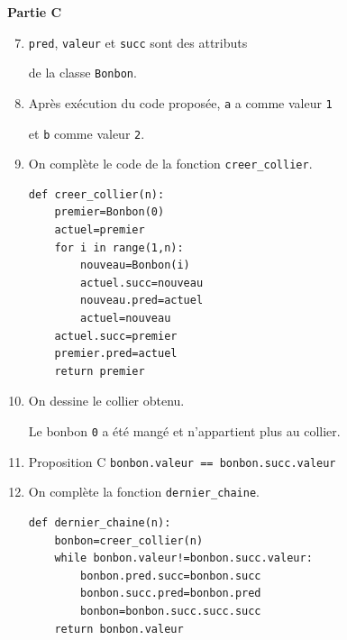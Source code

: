 \documentclass[11pt,a4paper]{article}
\newcommand{\mip}[1]{\texttt{#1}}
\begin{document}
\vspace{-2cm}


\textbf{Partie C}

\begin{enumerate}
\setcounter{enumi}{6}
\item \mip{pred}, \mip{valeur} et \mip{succ} sont des attributs 

de la classe \mip{Bonbon}.
\item Après exécution du code proposée, \mip{a} a comme valeur \mip{1}

et \mip{b} comme valeur \mip{2}.

\item On complète le code de la fonction \mip{creer_collier}.

\begin{verbatim}
def creer_collier(n):
    premier=Bonbon(0)
    actuel=premier
    for i in range(1,n):
        nouveau=Bonbon(i)
        actuel.succ=nouveau
        nouveau.pred=actuel
        actuel=nouveau
    actuel.succ=premier
    premier.pred=actuel
    return premier
\end{verbatim}

\item On dessine le collier obtenu. 

Le bonbon \mip{0} a été mangé et n'appartient plus au collier.

\vspace{-3.5cm}
\hfill{}

\item Proposition C \mip{bonbon.valeur == bonbon.succ.valeur}


\newpage

\item On complète la fonction \mip{dernier_chaine}.
\begin{verbatim}
def dernier_chaine(n):
    bonbon=creer_collier(n)
    while bonbon.valeur!=bonbon.succ.valeur:
        bonbon.pred.succ=bonbon.succ
        bonbon.succ.pred=bonbon.pred
        bonbon=bonbon.succ.succ.succ
    return bonbon.valeur
\end{verbatim}

\end{enumerate}
\end{document}
